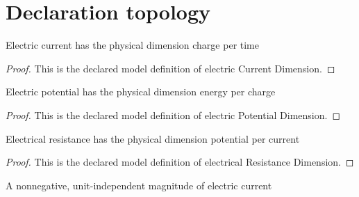\section{Declaration topology}
\begin{definition}
  \label{def:physics:phyx-mini-0572:phyxminiproblems-problemphyxmini0572-electriccurrentdimension}
  Electric current has the physical dimension charge per time
\end{definition}
\begin{proof}
  This is the declared model definition of electric Current Dimension.
\end{proof}
\begin{definition}
  \label{def:physics:phyx-mini-0572:phyxminiproblems-problemphyxmini0572-electricpotentialdimension}
  Electric potential has the physical dimension energy per charge
\end{definition}
\begin{proof}
  This is the declared model definition of electric Potential Dimension.
\end{proof}
\begin{definition}
  \label{def:physics:phyx-mini-0572:phyxminiproblems-problemphyxmini0572-electricalresistancedimension}
  Electrical resistance has the physical dimension potential per current
\end{definition}
\begin{proof}
  This is the declared model definition of electrical Resistance Dimension.
\end{proof}
\begin{definition}
  \label{def:physics:phyx-mini-0572:phyxminiproblems-problemphyxmini0572-electriccurrentquantity}
  A nonnegative, unit-independent magnitude of electric current
\end{definition}
